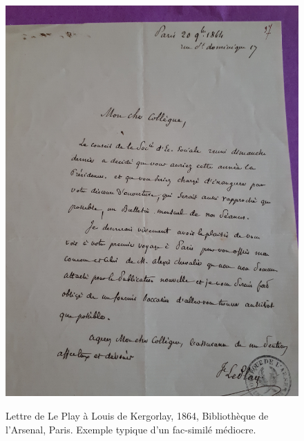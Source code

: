 \begin{figure}[H]
    \centering
    \caption{Lettre de Le Play à Louis de Kergorlay, 1864, Bibliothèque de l'Arsenal, Paris. Exemple typique d'un fac-similé médiocre.}
    \includegraphics[width=15cm]{images/5MS14112_p37_1p_20sept1864.jpg}
    \label{Kergorlay}
\end{figure}
